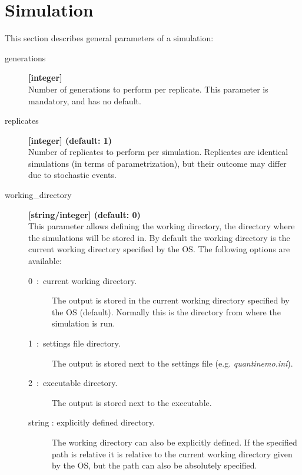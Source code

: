 \documentclass[letterpaper,12pt,oneside]{book}
\begin{document}
\newpage
\chapter{Simulation}\label{simparam}
This section describes general parameters of a simulation: 
\begin{description}
\item[generations]\textbf{[integer]}\\
Number of generations to perform per replicate. This parameter is mandatory, and has no default.
 
\item[replicates]\textbf{[integer] (default: 1)}\\
Number of replicates to perform per simulation. Replicates are identical simulations (in terms of parametrization), but their outcome may differ due to stochastic events. 

\item[working\_directory]\textbf{[string/integer] (default: 0)}\\
This parameter allows defining the working directory, the directory where the simulations will be stored in. By default the working directory is the current working directory specified by the OS. The following options are available:
\begin{description}
\item[0~:~current working directory.] The output is stored in the current working directory specified by the OS (default). Normally this is the directory from where the simulation is run. 
\item[1~:~settings file directory.] The output is stored next to the settings file (e.g. \textit{quantinemo.ini}).
\item[2~:~executable directory.] The output is stored next to the executable.  
\item[string : explicitly defined directory.] The working directory can also be explicitly defined. If the specified path is relative it is relative to the current working directory given by the OS, but the path can also be absolutely specified.
\end{description}



\end{description}
\end{document}
